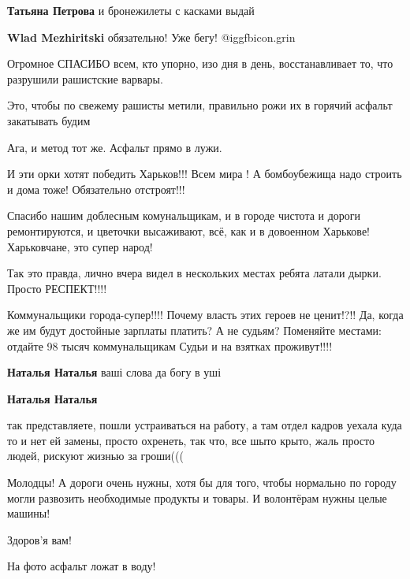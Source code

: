 \begin{itemize}
\begin{itemize}
\textbf{Татьяна Петрова} и бронежилеты с касками выдай

\textbf{Wlad Mezhiritski} обязательно! Уже бегу! @igg{fbicon.grin} 

\end{itemize} %


Огромное СПАСИБО всем, кто упорно, изо дня в день, восстанавливает то, что
разрушили рашистские варвары.


Это, чтобы по свежему рашисты метили, правильно рожи их в горячий асфальт
закатывать будим

Ага, и метод тот же. Асфальт прямо в лужи.


И эти орки хотят победить Харьков!!! Всем мира ! А бомбоубежища надо строить и
дома тоже! Обязательно отстроят!!!


Спасибо нашим доблесным комунальщикам, и в городе чистота и дороги
ремонтируются, и цветочки высаживают, всё, как и в довоенном
Харькове! Харьковчане, это супер народ!


Так это правда, лично вчера видел в нескольких местах ребята латали дырки.
Просто РЕСПЕКТ!!!!


\obeycr
Коммунальщики города-супер!!!!
Почему власть этих героев не ценит!?!!
Да, когда же им будут достойные зарплаты платить?
А не судьям?
Поменяйте местами: отдайте 98 тысяч коммунальщикам
Судьи и на взятках проживут!!!!
\restorecr

\begin{itemize} %
\textbf{Наталья Наталья} ваші слова да богу в уші

\textbf{Наталья Наталья} 

так представляете, пошли устраиваться на работу, а там отдел кадров уехала куда
то и нет ей замены, просто охренеть, так что, все шыто крыто, жаль просто
людей, рискуют жизнью за гроши(((

\end{itemize} %


Молодцы! А дороги очень нужны, хотя бы для того, чтобы нормально по городу
могли развозить необходимые продукты и товары. И волонтёрам нужны целые машины!

Здоров'я вам!


На фото асфальт ложат в воду!

\end{itemize} %
